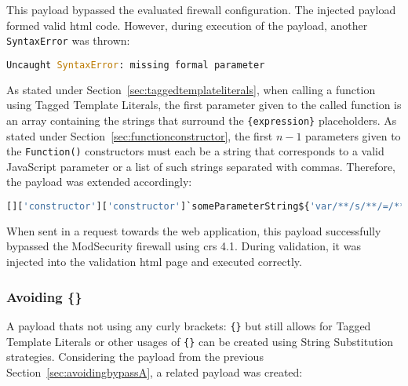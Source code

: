 This payload bypassed the evaluated firewall configuration. The injected payload formed valid \acrshort{html} code. However, during execution of the payload, another \verb|SyntaxError| was thrown:

\begin{lstlisting}[style=basicStyle, language=Python]
Uncaught SyntaxError: missing formal parameter
\end{lstlisting}

As stated under Section~\ref{sec:taggedtemplateliterals}, when calling a function using Tagged Template Literals, the first parameter given to the called function is an array containing the strings that surround the \verb|{expression}| placeholders. As stated under Section~\ref{sec:functionconstructor}, the first $n-1$ parameters given to the \verb|Function()| constructors must each be a string that corresponds to a valid JavaScript parameter or a list of such strings separated with commas. 
Therefore, the payload was extended accordingly:

\begin{lstlisting}[style=basicStyle, language=Python, caption={avoiding () bypass}, label={lst:avoiding () bypass}]
[]['constructor']['constructor']`someParameterString${'var/**/s/**/=/**/"secret";promp'+'t`s\\u{0024}{s}`'}```
\end{lstlisting}

When sent in a request towards the web application, this payload successfully bypassed the ModSecurity firewall using \acrshort{crs} 4.1. During validation, it was injected into the validation \acrshort{html} page and executed correctly. 



\subsubsection{Avoiding \{\}}
\label{sec:avoidingbypassB}
A payload thats not using any curly brackets: \verb|{}| but still allows for Tagged Template Literals or other usages of \verb|{}| can be created using String Substitution strategies. Considering the payload from the previous Section~\ref{sec:avoidingbypassA}, a related payload was created:

